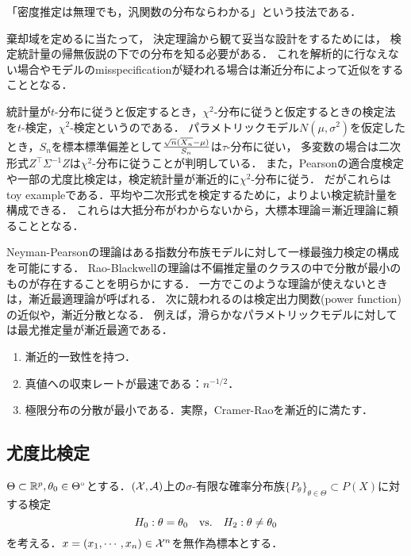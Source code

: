 \documentclass[uplatex,dvipdfmx]{jsreport}
\begin{document}
\begin{tcolorbox}[colframe=ForestGreen, colback=ForestGreen!10!white,breakable,colbacktitle=ForestGreen!40!white,coltitle=black,fonttitle=\bfseries\sffamily,
title=]
    「密度推定は無理でも，汎関数の分布ならわかる」という技法である．
\end{tcolorbox}

棄却域を定めるに当たって，
決定理論から観て妥当な設計をするためには，
検定統計量の帰無仮説の下での分布を知る必要がある．
これを解析的に行なえない場合やモデルのmisspecificationが疑われる場合は漸近分布によって近似をすることとなる．

統計量が$t$-分布に従うと仮定するとき，$\chi^2$-分布に従うと仮定するときの検定法を$t$-検定，$\chi^2$-検定というのである．
パラメトリックモデル$N(\mu,\sigma^2)$を仮定したとき，$S_n$を標本標準偏差として$\frac{\sqrt{n}(\overline{X_n}-\mu)}{S_n}$は$\tau$-分布に従い，
多変数の場合は二次形式$Z^\top\Sigma^{-1}Z$は$\chi^2$-分布に従うことが判明している．
また，Pearsonの適合度検定や一部の尤度比検定は，検定統計量が漸近的に$\chi^2$-分布に従う．
だがこれらはtoy exampleである．平均や二次形式を検定するために，よりよい検定統計量を構成できる．
これらは大抵分布がわからないから，大標本理論＝漸近理論に頼ることとなる．

Neyman-Pearsonの理論はある指数分布族モデルに対して一様最強力検定の構成を可能にする．
Rao-Blackwellの理論は不偏推定量のクラスの中で分散が最小のものが存在することを明らかにする．
一方でこのような理論が使えないときは，漸近最適理論が呼ばれる．
次に競われるのは検定出力関数(power function)の近似や，漸近分散となる．
例えば，滑らかなパラメトリックモデルに対しては最尤推定量が漸近最適である．
\begin{enumerate}
    \item 漸近的一致性を持つ．
    \item 真値への収束レートが最速である：$n^{-1/2}$．
    \item 極限分布の分散が最小である．実際，Cramer-Raoを漸近的に満たす．
\end{enumerate}

\subsection{尤度比検定}

\begin{notation}
    $\Theta\subset\mathbb{R}^p,\theta_0\in\Theta^\circ$とする．$(\mathcal{X},\mathcal{A})$上の$\sigma$-有限な確率分布族$\{P_\theta\}_{\theta\in\Theta}\subset P(X)$に対する検定
    \[H_0:\theta=\theta_0\quad\mathrm{vs.}\quad H_2:\theta\ne\theta_0\]
    を考える．$x=(x_1,\cdots,x_n)\in\mathcal{X}^n$を無作為標本とする．
\end{notation}
\end{document}
